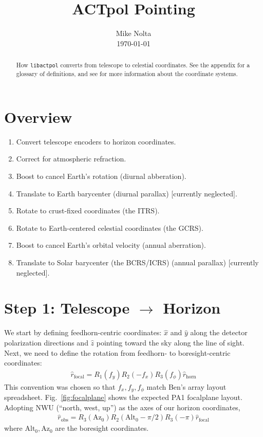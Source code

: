 \documentclass[10pt,preprint]{aastex}
\newcommand{\alt}{\mathrm{Alt}_0}
\newcommand{\az}{\mathrm{Az}_0}
\newcommand{\rhorn}{{\hat r}_\mathrm{horn}}
\newcommand{\rfocal}{{\hat r}_\mathrm{focal}}
\newcommand{\robs}{{\hat r}_\mathrm{obs}}
\begin{document}
\title{ACTpol Pointing}
\author{Mike Nolta\\\today}

\begin{abstract}
How \texttt{libactpol} converts from telescope to celestial coordinates.
See the appendix for a glossary of definitions, and see \citet{usno179} for more
information about the coordinate systems.
\end{abstract}

\section{Overview}

\begin{enumerate}
\item Convert telescope encoders to horizon coordinates.
\item Correct for atmospheric refraction.
\item Boost to cancel Earth's rotation (diurnal abberation).
\item Translate to Earth barycenter (diurnal parallax) [currently neglected].
\item Rotate to crust-fixed coordinates (the ITRS).
\item Rotate to Earth-centered celestial coordinates (the GCRS).
\item Boost to cancel Earth's orbital velocity (annual aberration).
\item Translate to Solar barycenter (the BCRS/ICRS) (annual parallax) [currently neglected].
\end{enumerate}

\section{Step 1: Telescope $\to$ Horizon}

We start by defining feedhorn-centric coordinates:
$\hat x$ and $\hat y$ along the detector polarization directions
and $\hat z$ pointing toward the sky along the line of sight.
Next, we need to define the rotation from feedhorn- to boresight-centric coordinates:
\begin{eqnarray}
\rfocal = R_1(f_y)R_2(-f_x)R_3(f_\phi) \rhorn
\end{eqnarray}
This convention was chosen so that $f_x,f_y,f_\phi$ match Ben's array layout spreadsheet.
Fig.~\ref{fig:focalplane} shows the expected PA1 focalplane layout.
Adopting NWU (``north, west, up'') as the axes of our horizon coordinates,
\begin{eqnarray}
\robs = R_3(\az)R_2(\alt-\pi/2)R_3(-\pi) \rfocal
\end{eqnarray}
where $\alt,\az$ are the boresight coordinates.
\end{document}

